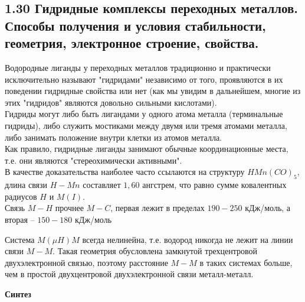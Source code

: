 \subsection{1.30 Гидридные комплексы переходных металлов. Способы получения и условия стабильности, геометрия, электронное строение, свойства.}
Водородные лиганды у переходных металлов традиционно и практически исключительно называют "гидридами" независимо от того, проявляются в их поведении гидридные свойства или нет (как мы увидим в дальнейшем, многие из этих "гидридов" являются довольно сильными кислотами). \\
Гидриды могут либо быть лигандами у одного атома металла (терминальные гидриды), либо служить мостиками между двумя или тремя атомами металла, либо занимать положение внутри клетки из атомов металла.  \\
Как правило, гидридные лиганды занимают обычные координационные места, т.е. они являются "стереохимически активными". \\
В качестве доказательства наиболее часто ссылаются на структуру $HMn(CO)_5$, длина связи $H-Mn$ составляет $1,60$ ангстрем, что равно сумме ковалентных радиусов $H$ и $M(I)$. \\
Связь $M-H$ прочнее $M-C$, первая лежит в пределах $190-250$ кДж/моль, а вторая -- $150-180 $ кДж/моль  	
\begin{figure} [H]
	\centering {\texttt{[image: oo2]}}
\end{figure}
Система $M(\mu H)M$ всегда нелинейна, т.е. водород никогда не лежит на линии связи $M - M$. Такая геометрия обусловлена замкнутой трехцентровой двухэлектронной связью, поэтому расстояние $M - M$ в таких системах больше, чем в простой двухцентровой двухэлектронной связи металл-металл.
\begin{figure} [H]
	\centering {\texttt{[image: oo3]}}
\end{figure}
\textbf{Синтез}
